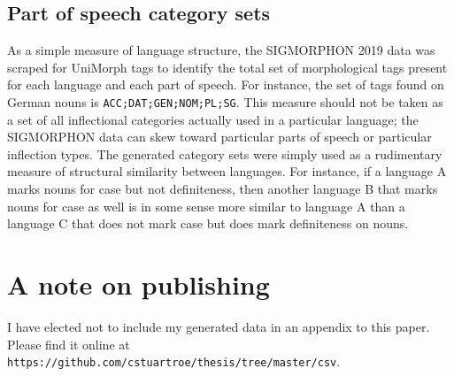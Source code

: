 \subsection{Part of speech category sets}

As a simple measure of language structure, the SIGMORPHON 2019 data was scraped for UniMorph tags to identify the total set of morphological tags present for each language and each part of speech. For instance, the set of tags found on German nouns is \texttt{ACC;DAT;GEN;NOM;PL;SG}. This measure should not be taken as a set of all inflectional categories actually used in a particular language; the SIGMORPHON data can skew toward particular parts of speech or particular inflection types. The generated category sets were simply used as a rudimentary measure of structural similarity between languages. For instance, if a language A marks nouns for case but not definiteness, then another language B that marks nouns for case as well is in some sense more similar to language A than a language C that does not mark case but does mark definiteness on nouns.

\section{A note on publishing}

I have elected not to include my generated data in an appendix to this paper. Please find it online at \texttt{https://github.com/cstuartroe/thesis/tree/master/csv}.